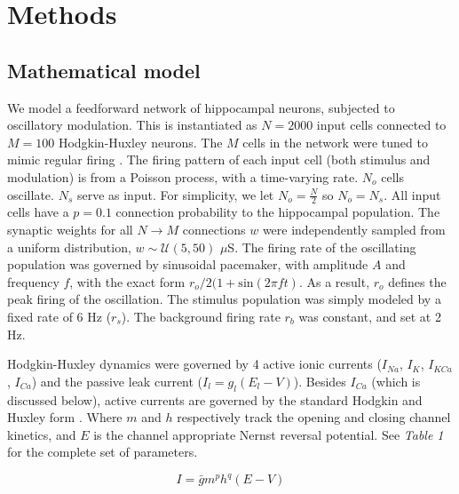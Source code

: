 \documentclass{article}
\begin{document}

\section*{Methods}
\subsection*{Mathematical model}
We model a feedforward network of hippocampal neurons, subjected to oscillatory modulation. This is instantiated as $N = 2000$ input cells connected to $M = 100$ Hodgkin-Huxley neurons. The $M$ cells in the network were tuned to mimic regular firing \cite{Borgers2005,Borgers2008}. The firing pattern of each input cell (both stimulus and modulation) is from a Poisson process, with a time-varying rate. $N_o$ cells oscillate. $N_s$ serve as input. For simplicity, we let $N_o = \frac{N}{2}$ so $N_o = N_s$. All input cells have a $p = 0.1$ connection probability to the hippocampal population. The synaptic weights for all $N \rightarrow M$ connections $w$ were independently sampled from a uniform distribution, $w \sim \mathcal{U}(5, 50)$ $\mu$S. The firing rate of the oscillating population was governed by sinusoidal pacemaker, with amplitude $A$ and frequency $f$, with the exact form $r_o / 2 (1 + \text{sin}(2 \pi f t)$. As a result, $r_o$ defines the peak firing of the oscillation. The stimulus population was simply modeled by a fixed rate of 6 Hz ($r_s$). The background firing rate $r_b$ was constant, and set at 2 Hz.

Hodgkin-Huxley dynamics were governed by 4 active ionic currents ($I_{Na}$, $I_{K}$, $I_{KCa}$, $I_{Ca}$) and the passive leak current ($I_l = g_l (E_l - V)$). Besides $I_{Ca}$ (which is discussed below), active currents are governed by the standard Hodgkin and Huxley form \cite{Hodgkin1952}. Where $m$ and $h$ respectively track the opening and closing channel kinetics, and $E$ is the channel appropriate Nernst reversal potential. See \textit{Table 1} for the complete set of parameters.

\begin{equation}
\label{eq:Idef}
I = \bar{g} m^p h^q (E - V)
\end{equation}
\end{document}
